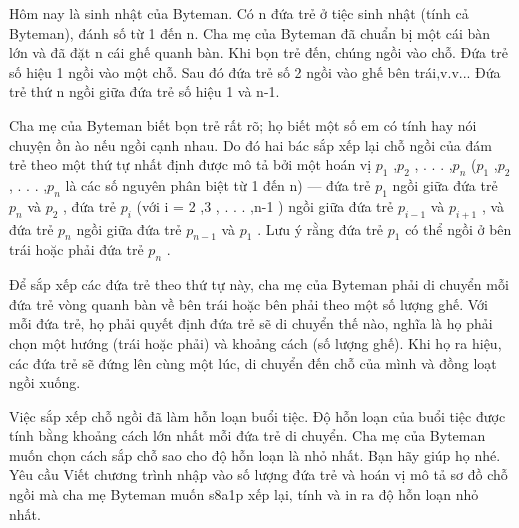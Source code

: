 Hôm nay là sinh nhật của Byteman. Có n đứa trẻ ở tiệc sinh nhật (tính cả Byteman), đánh số từ 1 đến n. Cha mẹ của Byteman đã chuẩn bị một cái bàn lớn và đã đặt n cái ghế quanh bàn. Khi bọn trẻ đến, chúng ngồi vào chỗ. Đứa trẻ số hiệu 1 ngồi vào một chỗ. Sau đó đứa trẻ số 2 ngồi vào ghế bên trái,v.v... Đứa trẻ thứ n ngồi giữa đứa trẻ số hiệu 1 và n-1.  

   Cha mẹ của Byteman biết bọn trẻ rất rõ; họ biết một số em có tính hay nói chuyện ồn ào nếu ngồi cạnh nhau. Do đó hai bác sắp xếp lại chỗ ngồi của đám trẻ theo một thứ tự nhất định được mô tả bởi một hoán vị $p_{1}$   ,$p_{2}$   , . . . ,$p_{n}$   ($p_{1}$   ,$p_{2}$   , . . . ,$p_{n}$   là các số nguyên phân biệt từ 1 đến n) — đứa trẻ $p_{1}$   ngồi giữa đứa trẻ $p_{n}$   và $p_{2}$   , đứa trẻ $p_{i}$   (với i = 2 ,3 , . . . ,n-1 ) ngồi giữa đứa trẻ $p_{i-1}$   và $p_{i+1}$   , và đứa trẻ $p_{n}$   ngồi giữa đứa trẻ $p_{n-1}$   và $p_{1}$   . Lưu ý rằng đứa trẻ $p_{1}$   có thể ngồi ở bên trái hoặc phải đứa trẻ $p_{n}$   .  

   Để sắp xếp các đứa trẻ theo thứ tự này, cha mẹ của Byteman phải di chuyển mỗi đứa trẻ vòng quanh bàn về bên trái hoặc bên phải theo một số lượng ghế. Với mỗi đứa trẻ, họ phải quyết định đứa trẻ sẽ di chuyển thế nào, nghĩa là họ phải chọn một hướng (trái hoặc phải) và khoảng cách (số lượng ghế). Khi họ ra hiệu, các đứa trẻ sẽ đứng lên cùng một lúc, di chuyển đến chỗ của mình và đồng loạt ngồi xuống.  

   Việc sắp xếp chỗ ngồi đã làm hỗn loạn buổi tiệc. Độ hỗn loạn của buổi tiệc được tính bằng khoảng cách lớn nhất mỗi đứa trẻ di chuyển. Cha mẹ của Byteman muốn chọn cách sắp chỗ sao cho độ hỗn loạn là nhỏ nhất. Bạn hãy giúp họ nhé.
Yêu cầu
Viết chương trình nhập vào số lượng đứa trẻ và hoán vị mô tả sơ đồ chỗ ngồi mà cha mẹ Byteman muốn s8a1p xếp lại, tính và in ra độ hỗn loạn nhỏ nhất.